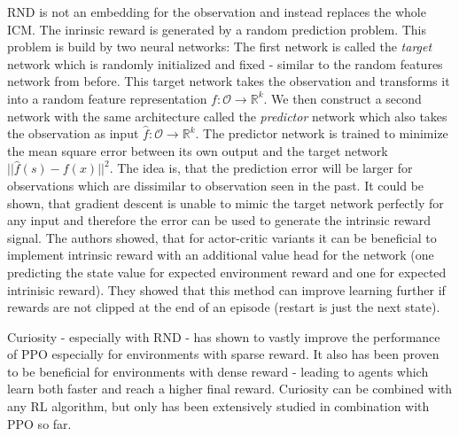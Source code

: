 RND is not an embedding for the observation and instead replaces the whole ICM. The inrinsic reward is generated by a random prediction problem. This problem is build by two neural networks: The first network is called the \textit{target} network which is randomly initialized and fixed - similar to the random features network from before. This target network takes the observation and transforms it into a random feature representation $f : \mathcal{O} \rightarrow \mathbb{R}^k$. We then construct a second network with the same architecture called the \textit{predictor} network which also takes the observation as input $\hat{f} : \mathcal{O} \rightarrow \mathbb{R}^k$. The predictor network is trained to minimize the mean square error between its own output and the target network $||\hat{f}(s) - f(x)||^2$. The idea is, that the prediction error will be larger for observations which are dissimilar to observation seen in the past. It could be shown, that gradient descent is unable to mimic the target network perfectly for any input and therefore the error can be used to generate the intrinsic reward signal. The authors showed, that for actor-critic variants it can be beneficial to implement intrinsic reward with an additional value head for the network (one predicting the state value for expected environment reward and one for expected intrinisic reward). They showed that this method can improve learning further if rewards are not clipped at the end of an episode (restart is just the next state). 

Curiosity - especially with RND - has shown to vastly improve the performance of PPO especially for environments with sparse reward. It also has been proven to be beneficial for environments with dense reward - leading to agents which learn both faster and reach a higher final reward. Curiosity can be combined with any RL algorithm, but only has been extensively studied in combination with PPO so far.